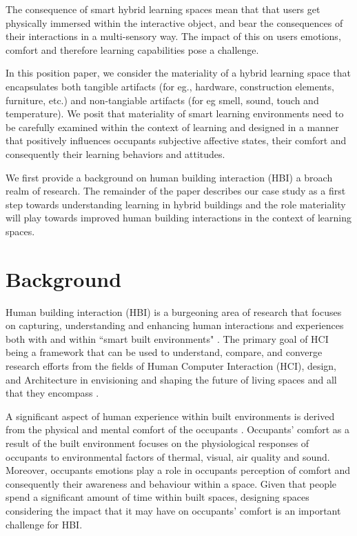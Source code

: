 \documentclass[acmconf, anonymous, review]{acmart}
\begin{document}
The consequence of smart hybrid learning spaces mean that that users get physically immersed within the interactive object, and bear the consequences of their interactions in a multi-sensory way. The impact of this on users emotions, comfort and therefore learning capabilities pose a challenge.  


In this position paper, we consider the materiality of a hybrid learning space that encapsulates both tangible artifacts (for eg., hardware, construction elements, furniture, etc.) and non-tangiable artifacts (for eg smell, sound, touch and temperature). We posit that materiality of smart learning environments need to be carefully examined within the context of learning and designed in a manner that positively influences occupants subjective affective states, their comfort and consequently their learning behaviors and attitudes.
                                    
We first provide a background on human building interaction (HBI) a broach realm of research. The remainder of the paper describes our case study as a first step towards understanding learning in hybrid buildings and the role materiality will play towards improved human building interactions in the context of learning spaces. 



\section{Background}
Human building interaction (HBI) is a burgeoning area of research that focuses on capturing, understanding and enhancing human interactions and experiences both with and within ``smart built environments" \cite{alavi2016future}. The primary goal of HCI being a framework that can be used to understand, compare, and converge research efforts from the fields of Human Computer Interaction (HCI), design, and Architecture in envisioning and shaping the future of living spaces and all that they encompass \cite{nembrini2017human, alavi2018artifacts}. 


A significant aspect of human experience within built environments is derived from the physical and mental comfort of the occupants \cite{alavi2017comfort}. Occupants' comfort as a result of the built environment focuses on the physiological responses of occupants to environmental factors of thermal, visual, air quality and sound. Moreover, occupants emotions play a role in occupants perception of comfort and consequently their awareness and behaviour within a space. Given that people spend a significant amount of time within built spaces, designing spaces considering the impact that it may have on occupants’ comfort is an important challenge for HBI. 
\end{document}
